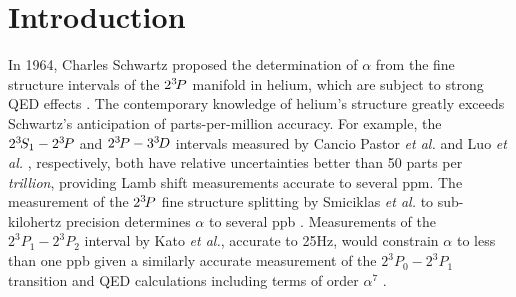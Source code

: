 \section{Introduction}

  In 1964, Charles Schwartz proposed the determination of $\alpha$ from the fine structure intervals of the $2^{3\!} P$ manifold in helium, which are subject to strong QED effects \cite{Schwartz64}.
	The contemporary knowledge of helium's structure greatly exceeds Schwartz's anticipation of parts-per-million accuracy.
	For example, the $2^{3\!} S_1 - 2^{3\!} P$ and $2^{3\!} P - 3^{3\!} D$ intervals measured by Cancio Pastor \textit{et al.} \cite{Pastor04} and Luo \emph{et al.} \cite{Luo15}, respectively, both have relative uncertainties better than 50 parts per \emph{trillion}, providing Lamb shift measurements accurate to several ppm.
	The measurement of the $2^{3\!}P$ fine structure splitting by Smiciklas \textit{et al.} to sub-kilohertz precision determines $\alpha$ to several ppb \cite{Smiciklas10}.
	Measurements of the $2^{3\!}P_1-2^{3\!}P_2$ interval by Kato \emph{et al.}, accurate to 25Hz, would constrain $\alpha$ to less than one ppb given a similarly accurate measurement of the $2^{3\!}P_0 - 2^{3\!}P_1$ transition and QED calculations including terms of order $\alpha^7$ \cite{Kato18}.
	


